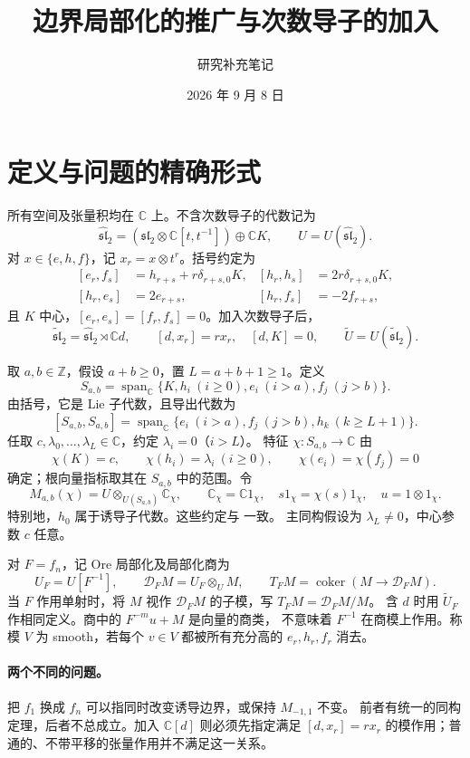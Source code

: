 \documentclass[UTF8,11pt]{ctexart}
\title{边界局部化的推广与次数导子的加入}
\author{研究补充笔记}
\date{2026 年 9 月 8 日}
\newcommand{\C}{\mathbb C}
\newcommand{\Z}{\mathbb Z}
\newcommand{\g}{\widehat{\mathfrak{sl}}_2}
\newcommand{\gt}{\widetilde{\mathfrak{sl}}_2}
\newcommand{\Span}{\operatorname{span}_{\C}}
\newcommand{\D}{\mathcal D}
\theoremstyle{definition}
\begin{document}
\maketitle

\section{定义与问题的精确形式}

所有空间及张量积均在 \(\C\) 上。不含次数导子的代数记为
\[
 \g=(\mathfrak{sl}_2\otimes\C[t,t^{-1}])\oplus\C K,\qquad U=U(\g).
\]
对 \(x\in\{e,h,f\}\)，记 \(x_r=x\otimes t^r\)。括号约定为
\begin{equation}\label{eq:brackets}
\begin{aligned}
 [e_r,f_s]&=h_{r+s}+r\delta_{r+s,0}K,&[h_r,h_s]&=2r\delta_{r+s,0}K,\\
 [h_r,e_s]&=2e_{r+s},&[h_r,f_s]&=-2f_{r+s},
\end{aligned}
\end{equation}
且 \(K\) 中心，\([e_r,e_s]=[f_r,f_s]=0\)。加入次数导子后，
\[
 \gt=\g\rtimes\C d,\qquad [d,x_r]=r x_r,\quad[d,K]=0,
 \qquad\widetilde U=U(\gt).
\]

取 \(a,b\in\Z\)，假设 \(a+b\ge0\)，置 \(L=a+b+1\ge1\)。定义
\[
 S_{a,b}=\Span\{K,h_i\ (i\ge0),e_i\ (i>a),f_j\ (j>b)\}.
\]
由括号，它是 Lie 子代数，且导出代数为
\[
 [S_{a,b},S_{a,b}]=\Span\{e_i\ (i>a),f_j\ (j>b),h_k\ (k\ge L+1)\}.
\]
任取 \(c,\lambda_0,\ldots,\lambda_L\in\C\)，约定 \(\lambda_i=0\)（\(i>L\)）。
特征 \(\chi:S_{a,b}\to\C\) 由
\[
 \chi(K)=c,\qquad\chi(h_i)=\lambda_i\ (i\ge0),\qquad
 \chi(e_i)=\chi(f_j)=0
\]
确定；根向量指标取其在 \(S_{a,b}\) 中的范围。令
\[
 M_{a,b}(\chi)=U\otimes_{U(S_{a,b})}\C_\chi,\qquad
 \C_\chi=\C1_\chi,\quad s1_\chi=\chi(s)1_\chi,\quad u=1\otimes1_\chi.
\]
特别地，\(h_0\) 属于诱导子代数。这些约定与 \cite[\S2.3]{FGXZ} 一致。
主同构假设为 \(\lambda_L\ne0\)，中心参数 \(c\) 任意。

对 \(F=f_n\)，记 Ore 局部化及局部化商为
\[
 U_F=U[F^{-1}],\qquad \D_FM=U_F\otimes_U M,\qquad
 T_FM=\operatorname{coker}(M\longrightarrow\D_FM).
\]
当 \(F\) 作用单射时，将 \(M\) 视作 \(\D_FM\) 的子模，写 \(T_FM=\D_FM/M\)。
含 \(d\) 时用 \(\widetilde U_F\) 作相同定义。商中的 \(F^{-m}u+M\) 是向量的商类，
不意味着 \(F^{-1}\) 在商模上作用。称模 \(V\) 为 smooth，若每个 \(v\in V\)
都被所有充分高的 \(e_r,h_r,f_r\) 消去。

\paragraph{两个不同的问题。}
把 \(f_1\) 换成 \(f_n\) 可以指同时改变诱导边界，或保持 \(M_{-1,1}\) 不变。
前者有统一的同构定理，后者不总成立。加入 \(\C[d]\) 则必须先指定满足
\([d,x_r]=rx_r\) 的模作用；普通的、不带平移的张量作用并不满足这一关系。
\end{document}
